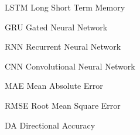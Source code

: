 \newcommand{\abbrlabel}[1]{\makebox[3cm][l]{\textbf{#1}}}
\newenvironment{abbreviations}{\begin{list}{}{\renewcommand{\makelabel}{\abbrlabel}}}{\end{list}}
\begin{abbreviations}
	\item [LSTM] Long Short Term Memory
	\item [GRU] Gated Neural Network
	\item [RNN] Recurrent Neural Network
	\item [CNN] Convolutional Neural Network
	\item[MAE] Mean Absolute Error
	\item[RMSE] Root Mean Square Error 
	\item[DA] Directional Accuracy
\end{abbreviations}
